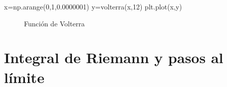 \begin{pyverbatim}
x=np.arange(0,1,0.0000001)
y=volterra(x,12)
plt.plot(x,y)
\end{pyverbatim}


 \begin{figure}[h]
 \begin{center}
 \caption{Función de Volterra}
\end{center}
 \end{figure}


\section{Integral de Riemann y pasos al límite}
\fi
